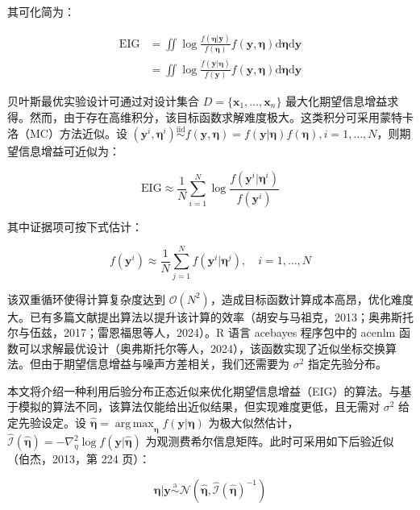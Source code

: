 \documentclass{ctexart}
\DeclareMathOperator*{\argmax}{arg\,max}
\begin{document}
其可化简为：

\begin{align*}
\mathrm{EIG}&=\iint\log\frac{f(\boldsymbol{\eta}|\boldsymbol{y})}{f(\boldsymbol{\eta})}f(\boldsymbol{y},\boldsymbol{\eta})\mathrm{d}\boldsymbol{\eta}\mathrm{d}\boldsymbol{y}\\
&=\iint\log\frac{f(\boldsymbol{y}|\boldsymbol{\eta})}{f(\boldsymbol{y})}f(\boldsymbol{y},\boldsymbol{\eta})\mathrm{d}\boldsymbol{\eta}\mathrm{d}\boldsymbol{y}
\end{align*}

贝叶斯最优实验设计可通过对设计集合 $D=\{\boldsymbol{x}_1,\dots,\boldsymbol{x}_n\}$ 最大化期望信息增益求得。然而，由于存在高维积分，该目标函数求解难度极大。这类积分可采用蒙特卡洛（MC）方法近似。设 $(\boldsymbol{y}^i,\boldsymbol{\eta}^i)\stackrel{\mathrm{iid}}{\sim}f(\boldsymbol{y},\boldsymbol{\eta})=f(\boldsymbol{y}|\boldsymbol{\eta})f(\boldsymbol{\eta}),i=1,\dots,N$，则期望信息增益可近似为：

\begin{equation*}
\mathrm{EIG}\approx\frac{1}{N}\sum_{i=1}^{N}\log\frac{f(\boldsymbol{y}^i|\boldsymbol{\eta}^i)}{f(\boldsymbol{y}^i)}
\end{equation*}

其中证据项可按下式估计：

\begin{equation*}
f(\boldsymbol{y}^i)\approx\frac{1}{N}\sum_{j=1}^{N}f(\boldsymbol{y}^i|\boldsymbol{\eta}^j),\quad i=1,\dots,N
\end{equation*}

该双重循环使得计算复杂度达到 $\mathcal{O}(N^2)$，造成目标函数计算成本高昂，优化难度大。已有多篇文献提出算法以提升该计算的效率（胡安与马祖克，2013；奥弗斯托尔与伍兹，2017；雷恩福思等人，2024）。R 语言 acebayes 程序包中的 acenlm 函数可以求解最优设计（奥弗斯托尔等人，2024），该函数实现了近似坐标交换算法。但由于期望信息增益与噪声方差相关，我们还需要为 $\sigma^2$ 指定先验分布。

本文将介绍一种利用后验分布正态近似来优化期望信息增益（EIG）的算法。与基于模拟的算法不同，该算法仅能给出近似结果，但实现难度更低，且无需对 $\sigma^2$ 给定先验设定。设 $\widehat{\boldsymbol{\eta}}=\argmax_{\boldsymbol{\eta}}f(\boldsymbol{y}|\boldsymbol{\eta})$ 为极大似然估计，$\widehat{\mathcal{I}}(\widehat{\boldsymbol{\eta}})=-\nabla^2_{\eta}\log f(\boldsymbol{y}|\widehat{\boldsymbol{\eta}})$ 为观测费希尔信息矩阵。此时可采用如下后验近似（伯杰，2013，第 224 页）：

\begin{equation*}
\boldsymbol{\eta}|\boldsymbol{y}\stackrel{\mathrm{a}}{\sim}\mathcal{N}(\widehat{\boldsymbol{\eta}},\widehat{\mathcal{I}}(\widehat{\boldsymbol{\eta}})^{-1})
\end{equation*}
\end{document}
